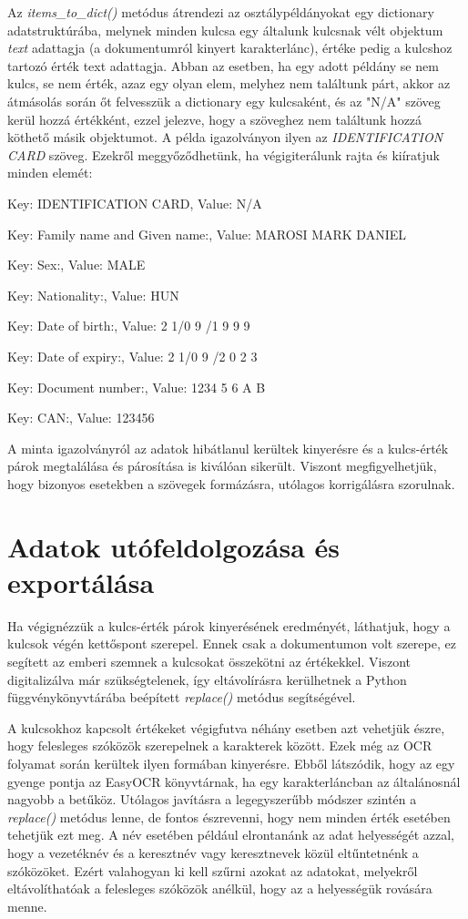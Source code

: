 \documentclass[12pt]{report}
\begin{document}
Az \emph{items\_to\_dict()} metódus átrendezi az osztálypéldányokat egy dictionary adatstruktúrába, melynek minden kulcsa egy általunk kulcsnak vélt objektum \emph{text} adattagja (a dokumentumról kinyert karakterlánc), értéke pedig a kulcshoz tartozó érték text adattagja. Abban az esetben, ha egy adott példány se nem kulcs, se nem érték, azaz egy olyan elem, melyhez nem találtunk párt, akkor az átmásolás során őt felvesszük a dictionary egy kulcsaként, és az "N/A" szöveg kerül hozzá értékként, ezzel jelezve, hogy a szöveghez nem találtunk hozzá köthető másik objektumot. A példa igazolványon ilyen az \emph{IDENTIFICATION CARD} szöveg.
Ezekről meggyőződhetünk, ha végigiterálunk rajta és kiíratjuk minden elemét:

\begin{tcolorbox}
    Key: IDENTIFICATION CARD, Value: N/A

    Key: Family name and Given name:, Value: MAROSI MARK DANIEL

    Key: Sex:, Value: MALE

    Key: Nationality:, Value: HUN

    Key: Date of birth:, Value: 2 1/0 9 /1 9 9 9

    Key: Date of expiry:, Value: 2 1/0 9 /2 0 2 3

    Key: Document number:, Value: 1234 5 6 A B

    Key: CAN:, Value: 123456
\end{tcolorbox}

A minta igazolványról az adatok hibátlanul kerültek kinyerésre és a kulcs-érték párok megtalálása és párosítása is kiválóan sikerült. Viszont megfigyelhetjük, hogy bizonyos esetekben a szövegek formázásra, utólagos korrigálásra szorulnak.

\section{Adatok utófeldolgozása és exportálása}

Ha végignézzük a kulcs-érték párok kinyerésének eredményét, láthatjuk, hogy a kulcsok végén kettőspont szerepel. Ennek csak a dokumentumon volt szerepe, ez segített az emberi szemnek a kulcsokat összekötni az értékekkel. Viszont digitalizálva már szükségtelenek, így eltávolírásra kerülhetnek a Python függvénykönyvtárába beépített \emph{replace()} metódus segítségével.

A kulcsokhoz kapcsolt értékeket végigfutva néhány esetben azt vehetjük észre, hogy felesleges szóközök szerepelnek a karakterek között. Ezek még az OCR folyamat során kerültek ilyen formában kinyerésre. Ebből látszódik, hogy az egy gyenge pontja az EasyOCR könyvtárnak, ha egy karakterláncban az általánosnál nagyobb a betűköz. Utólagos javításra a legegyszerűbb módszer szintén a \emph{replace()} metódus lenne, de fontos észrevenni, hogy nem minden érték esetében tehetjük ezt meg. A név esetében például elrontanánk az adat helyességét azzal, hogy a vezetéknév és a keresztnév vagy keresztnevek közül eltűntetnénk a szóközöket. 
Ezért valahogyan ki kell szűrni azokat az adatokat, melyekről eltávolíthatóak a felesleges szóközök anélkül, hogy az a helyességük rovására menne.
\end{document}
